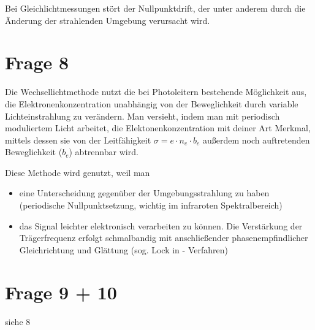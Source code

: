 Bei Gleichlichtmessungen stört der Nullpunktdrift, der unter anderem durch die Änderung der strahlenden Umgebung verursacht wird.

\section{Frage 8}


Die Wechsellichtmethode nutzt die bei Photoleitern bestehende Möglichkeit aus, die Elektronenkonzentration unabhängig von der Beweglichkeit durch variable Lichteinstrahlung zu verändern. Man versieht, indem man mit periodisch moduliertem Licht arbeitet, die Elektonenkonzentration mit deiner Art Merkmal, mittels dessen sie von der Leitfähigkeit $\sigma = e \cdot n_e \cdot b_e$ außerdem noch auftretenden Beweglichkeit ($b_e$) abtrennbar wird. 

Diese Methode wird genutzt, weil man 

\begin{itemize}
	\item eine Unterscheidung gegenüber der Umgebungsstrahlung zu haben (periodische 
	Nullpunktsetzung, wichtig im infraroten Spektralbereich)
	\item das Signal leichter elektronisch verarbeiten zu können. Die Verstärkung der Trägerfrequenz 
	erfolgt schmalbandig mit anschließender phasenempfindlicher Gleichrichtung und 
	Glättung (sog. Lock in - Verfahren)
\end{itemize}


\section{Frage 9 + 10}

siehe 8







